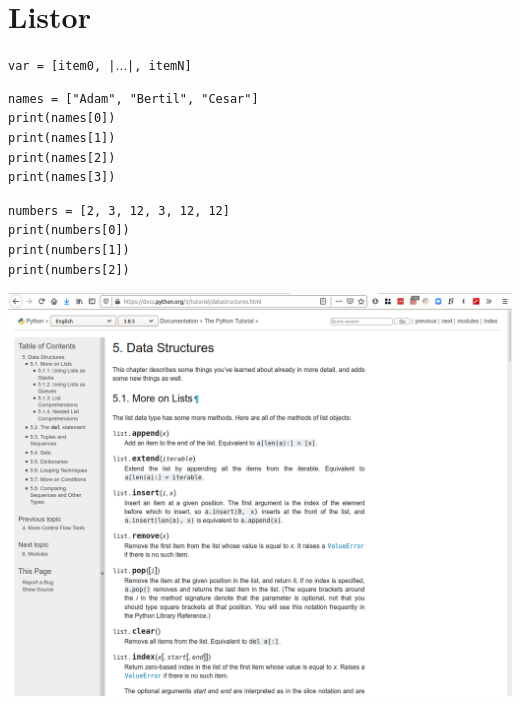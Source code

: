\mode*

\section{Listor}

\begin{frame}[fragile]
  \texttt{var = [item0, |$\dotsc$|, itemN]}
\end{frame}

\begin{frame}[fragile]
  \begin{example}
    \begin{verbatim}
names = ["Adam", "Bertil", "Cesar"]
print(names[0])
print(names[1])
print(names[2])
print(names[3])
    \end{verbatim}
  \end{example}

  \pause

  \begin{example}
    \begin{verbatim}
numbers = [2, 3, 12, 3, 12, 12]
print(numbers[0])
print(numbers[1])
print(numbers[2])
    \end{verbatim}
  \end{example}
\end{frame}

\begin{frame}
  \includegraphics[width=\columnwidth]{figs/docs-lists.png}
\end{frame}

